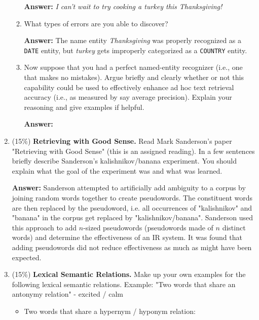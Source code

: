 \documentclass[11pt]{article}
\begin{document}
\begin{enumerate}
\begin{enumerate}
                        \textbf{Answer:} \textit{I can't wait to try cooking a turkey this Thanksgiving!}

                  \item What types of errors are you able to discover?

                        \textbf{Answer:} The name entity \textit{Thanksgiving} was properly recognized as a \texttt{DATE} entity, but \textit{turkey} gets improperly categorized as a \texttt{COUNTRY} entity.

                  \item Now suppose that you had a perfect named-entity recognizer (i.e., one that makes no mistakes). Argue briefly and clearly whether or not this capability could be used to effectively enhance ad hoc text retrieval accuracy (i.e., as measured by say average precision). Explain your reasoning and give examples if helpful.

                        \textbf{Answer:}

            \end{enumerate}

      \item (15\%) \textbf{Retrieving with Good Sense.} Read Mark Sanderson's paper "Retrieving with Good Sense" (this is an assigned reading). In a few sentences briefly describe Sanderson's kalishnikov/banana experiment. You should explain what the goal of the experiment was and what was learned.

            \textbf{Answer:} Sanderson attempted to artificially add ambiguity to a corpus by joining random words together to create pseudowords. The constituent words are then replaced by the pseudoword, i.e. all occurrences of "kalishnikov" and "banana" in the corpus get replaced by "kalishnikov/banana". Sanderson used this approach to add $n$-sized pseudowords (pseudowords made of $n$ distinct words) and determine the effectiveness of an IR system. It was found that adding pseudowords did not reduce effectiveness as much as might have been expected.

      \item (15\%) \textbf{Lexical Semantic Relations.} Make up your own examples for the following lexical semantic relations. Example: "Two words that share an antonymy relation" - excited / calm

            \begin{itemize}
                  \item Two words that share a hypernym / hyponym relation:


\end{itemize}
\end{enumerate}
\end{document}
